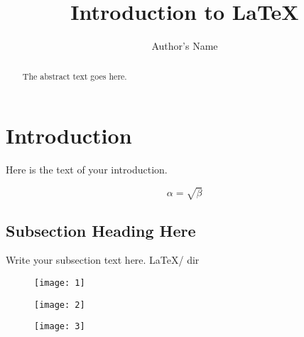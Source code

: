 \documentclass{article}
\begin{document}
	\title{Introduction to \LaTeX{}}
	\author{Author's Name}

	\maketitle

	\begin{abstract}
		The abstract text goes here.
	\end{abstract}

	\section{Introduction}
		Here is the text of your introduction.

	\begin{equation}
	    \label{simple_equation}
	    \alpha = \sqrt{ \beta }
	\end{equation}

	\subsection{Subsection Heading Here}
		Write your subsection text here.
		LaTeX/ 
		\jobname\unskip dir

	\begin{figure}
	\centering
	\texttt{[image: 1]}
	\end{figure}

	\begin{figure}
	\centering
	\texttt{[image: 2]}
	\end{figure}

	\begin{figure}
	\centering
	\texttt{[image: 3]}
	\end{figure}

	
\end{document}
